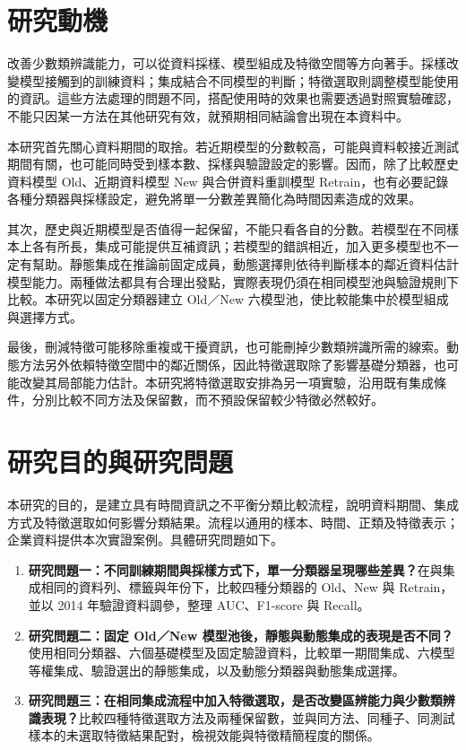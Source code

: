 \section{研究動機}

改善少數類辨識能力，可以從資料採樣、模型組成及特徵空間等方向著手。採樣改變模型接觸到的訓練資料；集成結合不同模型的判斷；特徵選取則調整模型能使用的資訊。這些方法處理的問題不同，搭配使用時的效果也需要透過對照實驗確認，不能只因某一方法在其他研究有效，就預期相同結論會出現在本資料中。

本研究首先關心資料期間的取捨。若近期模型的分數較高，可能與資料較接近測試期間有關，也可能同時受到樣本數、採樣與驗證設定的影響。因而，除了比較歷史資料模型 Old、近期資料模型 New 與合併資料重訓模型 Retrain，也有必要記錄各種分類器與採樣設定，避免將單一分數差異簡化為時間因素造成的效果。

其次，歷史與近期模型是否值得一起保留，不能只看各自的分數。若模型在不同樣本上各有所長，集成可能提供互補資訊；若模型的錯誤相近，加入更多模型也不一定有幫助。靜態集成在推論前固定成員，動態選擇則依待判斷樣本的鄰近資料估計模型能力。兩種做法都具有合理出發點，實際表現仍須在相同模型池與驗證規則下比較。本研究以固定分類器建立 Old／New 六模型池，使比較能集中於模型組成與選擇方式。

最後，刪減特徵可能移除重複或干擾資訊，也可能刪掉少數類辨識所需的線索。動態方法另外依賴特徵空間中的鄰近關係，因此特徵選取除了影響基礎分類器，也可能改變其局部能力估計。本研究將特徵選取安排為另一項實驗，沿用既有集成條件，分別比較不同方法及保留數，而不預設保留較少特徵必然較好。

\section{研究目的與研究問題}

本研究的目的，是建立具有時間資訊之不平衡分類比較流程，說明資料期間、集成方式及特徵選取如何影響分類結果。流程以通用的樣本、時間、正類及特徵表示；企業資料提供本次實證案例。具體研究問題如下。

\begin{enumerate}
\item \textbf{研究問題一：不同訓練期間與採樣方式下，單一分類器呈現哪些差異？}在與集成相同的資料列、標籤與年份下，比較四種分類器的 Old、New 與 Retrain，並以 2014 年驗證資料調參，整理 AUC、F1-score 與 Recall。
\item \textbf{研究問題二：固定 Old／New 模型池後，靜態與動態集成的表現是否不同？}使用相同分類器、六個基礎模型及固定驗證資料，比較單一期間集成、六模型等權集成、驗證選出的靜態集成，以及動態分類器與動態集成選擇。
\item \textbf{研究問題三：在相同集成流程中加入特徵選取，是否改變區辨能力與少數類辨識表現？}比較四種特徵選取方法及兩種保留數，並與同方法、同種子、同測試樣本的未選取特徵結果配對，檢視效能與特徵精簡程度的關係。
\end{enumerate}

